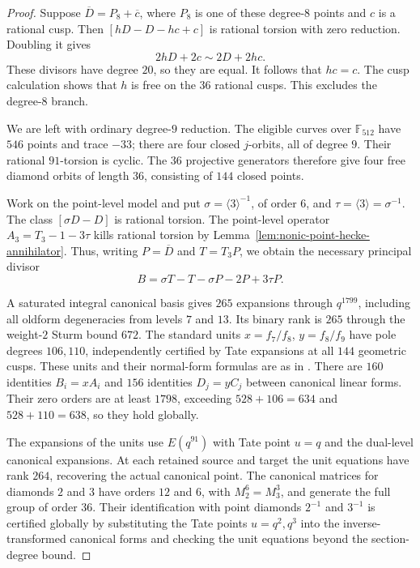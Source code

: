 \begin{proof}
Suppose $\overline D=P_8+\overline c$, where $P_8$ is one of these degree-$8$ points and $c$ is a rational cusp. Then $[hD-D-hc+c]$ is rational torsion with zero reduction. Doubling it gives
\[
 2hD+2c\sim2D+2hc.
\]
These divisors have degree $20$, so they are equal. It follows that $hc=c$. The cusp calculation shows that $h$ is free on the $36$ rational cusps. This excludes the degree-$8$ branch.

We are left with ordinary degree-$9$ reduction. The eligible curves over $\mathbb F_{512}$ have $546$ points and trace $-33$; there are four closed $j$-orbits, all of degree $9$. Their rational $91$-torsion is cyclic. The $36$ projective generators therefore give four free diamond orbits of length $36$, consisting of $144$ closed points.

Work on the point-level model and put $\sigma=\langle3\rangle^{-1}$, of order $6$, and $\tau=\langle3\rangle=\sigma^{-1}$. The class $[\sigma D-D]$ is rational torsion. The point-level operator $A_3=T_3-1-3\tau$ kills rational torsion by Lemma~\ref{lem:nonic-point-hecke-annihilator}. Thus, writing $P=\overline D$ and $T=T_3P$, we obtain the necessary principal divisor
\[
 B=\sigma T-T-\sigma P-2P+3\tau P.
\]

A saturated integral canonical basis gives $265$ expansions through $q^{1799}$, including all oldform degeneracies from levels $7$ and $13$. Its binary rank is $265$ through the weight-$2$ Sturm bound $672$. The standard units $x=f_7/f_8$, $y=f_8/f_9$ have pole degrees $106,110$, independently certified by Tate expansions at all $144$ geometric cusps. These units and their normal-form formulas are as in \cite[Sections~2 and~2.1]{DvH}. There are $160$ identities $B_i=xA_i$ and $156$ identities $D_j=yC_j$ between canonical linear forms. Their zero orders are at least $1798$, exceeding $528+106=634$ and $528+110=638$, so they hold globally.

The expansions of the units use $E(q^{91})$ with Tate point $u=q$ and the dual-level canonical expansions. At each retained source and target the unit equations have rank $264$, recovering the actual canonical point. The canonical matrices for diamonds $2$ and $3$ have orders $12$ and $6$, with $M_2^6=M_3^3$, and generate the full group of order $36$. Their identification with point diamonds $2^{-1}$ and $3^{-1}$ is certified globally by substituting the Tate points $u=q^2,q^3$ into the inverse-transformed canonical forms and checking the unit equations beyond the section-degree bound.


\end{proof}
